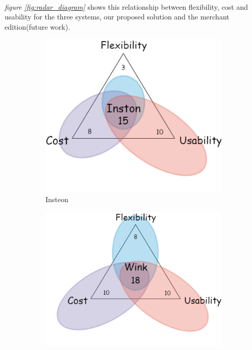 \documentclass[12pt, oneside, a4paper]{book}
\begin{document}
		\paragraph{} \textit{figure \ref{fig:radar_diagram}} shows this relationship between flexibility, cost and usability for the three systems, our proposed solution and the merchant edition(future work).
		\begin{figure}[H]
			\centering
			\begin{subfigure}[b]{.4\linewidth}
				\includegraphics[width=\linewidth]{img/Inston.png}
				\caption{Insteon}
			\end{subfigure}
			\begin{subfigure}[b]{.4\linewidth}
				\includegraphics[width=\linewidth]{img/Wink.png}

\end{subfigure}
\end{figure}
\end{document}
